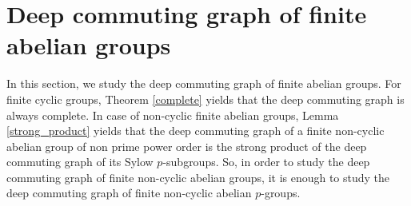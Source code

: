\documentclass[12pt,a4paper]{article}
\begin{document}
\section{Deep commuting graph of finite abelian groups}\label{Deep commuting graph of finite abelian groups}

In this section, we study the deep commuting graph of finite abelian groups. For finite cyclic groups, Theorem \ref{complete} yields that the deep commuting graph is always complete. In case of non-cyclic finite abelian groups, Lemma \ref{strong_product} yields that the deep commuting graph of a finite non-cyclic abelian group of non prime power order is the strong product of the deep commuting graph of its Sylow $p$-subgroups. So, in order to study the deep commuting graph of finite non-cyclic abelian groups, it is enough to study the deep commuting graph of finite non-cyclic abelian $p$-groups.
\end{document}
